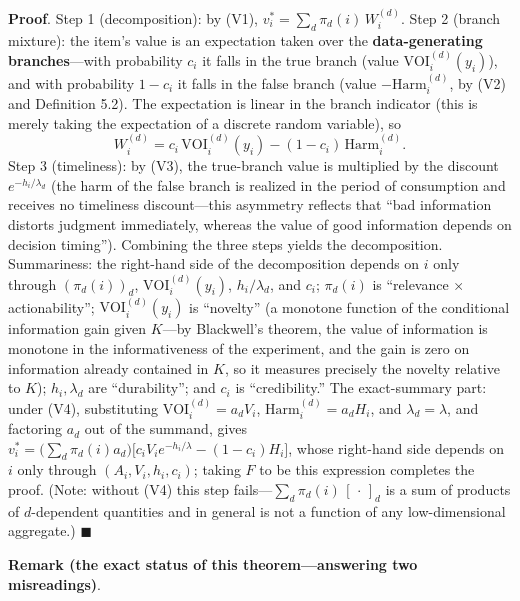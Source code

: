 \documentclass[
  11pt]{article}
\begin{document}
\textbf{Proof}. Step 1 (decomposition): by (V1),
\(v_i^* = \sum_d \pi_d(i)\,W_i^{(d)}\). Step 2 (branch mixture): the
item's value is an expectation taken over the \textbf{data-generating
branches}---with probability \(c_i\) it falls in the true branch (value
\(\mathrm{VOI}_i^{(d)}(y_i)\)), and with probability \(1-c_i\) it falls
in the false branch (value \(-\mathrm{Harm}_i^{(d)}\), by (V2) and
Definition 5.2). The expectation is linear in the branch indicator (this
is merely taking the expectation of a discrete random variable), so
\[W_i^{(d)} = c_i\,\mathrm{VOI}_i^{(d)}(y_i) - (1-c_i)\,\mathrm{Harm}_i^{(d)}.\]
Step 3 (timeliness): by (V3), the true-branch value is multiplied by the
discount \(e^{-h_i/\lambda_d}\) (the harm of the false branch is
realized in the period of consumption and receives no timeliness
discount---this asymmetry reflects that ``bad information distorts
judgment immediately, whereas the value of good information depends on
decision timing''). Combining the three steps yields the decomposition.
Summariness: the right-hand side of the decomposition depends on \(i\)
only through \((\pi_d(i))_{d}\), \(\mathrm{VOI}_i^{(d)}(y_i)\),
\(h_i/\lambda_d\), and \(c_i\); \(\pi_d(i)\) is ``relevance ×
actionability''; \(\mathrm{VOI}_i^{(d)}(y_i)\) is ``novelty'' (a
monotone function of the conditional information gain given \(K\)---by
Blackwell's theorem, the value of information is monotone in the
informativeness of the experiment, and the gain is zero on information
already contained in \(K\), so it measures precisely the novelty
relative to \(K\)); \(h_i, \lambda_d\) are ``durability''; and \(c_i\)
is ``credibility.'' The exact-summary part: under (V4), substituting
\(\mathrm{VOI}_i^{(d)} = a_dV_i\), \(\mathrm{Harm}_i^{(d)} = a_dH_i\),
and \(\lambda_d = \lambda\), and factoring \(a_d\) out of the summand,
gives
\(v_i^* = \big(\sum_d \pi_d(i)a_d\big)\big[c_iV_ie^{-h_i/\lambda} - (1-c_i)H_i\big]\),
whose right-hand side depends on \(i\) only through
\((A_i, V_i, h_i, c_i)\); taking \(F\) to be this expression completes
the proof. (Note: without (V4) this step
fails---\(\sum_d \pi_d(i)\,[\,\cdot\,]_d\) is a sum of products of
\(d\)-dependent quantities and in general is not a function of any
low-dimensional aggregate.) \(\blacksquare\)

\textbf{Remark (the exact status of this theorem---answering two
misreadings)}.
\end{document}
